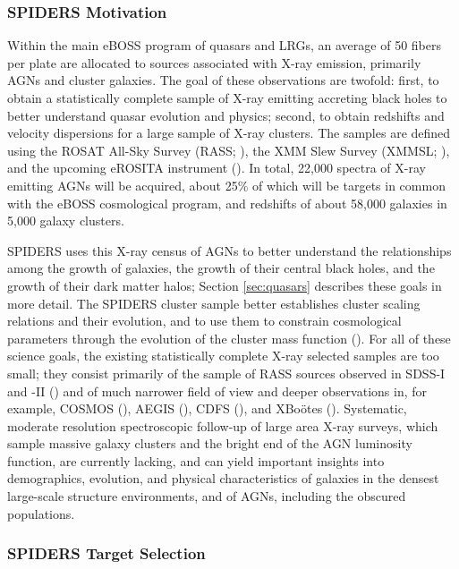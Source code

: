 \subsubsection{SPIDERS Motivation}

Within the main eBOSS program of quasars and LRGs, an average of 50
fibers per plate are allocated to sources associated with X-ray
emission, primarily AGNs and cluster galaxies. The goal of these
observations are twofold: first, to obtain a statistically complete
sample of X-ray emitting accreting black holes to better understand
quasar evolution and physics; second, to obtain redshifts and velocity
dispersions for a large sample of X-ray clusters.  The samples are
defined using the ROSAT All-Sky Survey
(RASS; \citealt{voges99a,boller16a}), the XMM Slew Survey
(XMMSL; \citealt{warwick12a}), and the upcoming eROSITA instrument
(\citealt{merloni12a}). In total, 22,000 spectra of X-ray emitting
AGNs
will be acquired, about 25\% of which will be targets in common with
the eBOSS cosmological program, and redshifts of about 58,000 galaxies
in 5,000 galaxy clusters.

SPIDERS uses this X-ray census of AGNs to better understand the
relationships among the growth of galaxies, the growth of their
central black holes, and the growth of their dark matter halos;
Section \ref{sec:quasars} describes these goals in more detail. The
SPIDERS cluster sample better establishes cluster scaling relations
and their evolution, and to use them to constrain cosmological
parameters through the evolution of the cluster mass function
(\citealt{allen11a, weinberg13a}).  For all of these science goals,
the existing statistically complete X-ray selected samples are too
small; they consist primarily of the sample of RASS sources observed
in SDSS-I and -II (\citealt{anderson03a}) and of much narrower
field of view and deeper observations in, for example, COSMOS
(\citealt{cappelluti09a, civano16a}), AEGIS (\citealt{laird09a,
nandra15a}), CDFS (\citealt{luo08a, xue11a}), and XBo{\"o}tes
(\citealt{kenter05a, murray05a}). Systematic, moderate resolution
spectroscopic follow-up of large area X-ray surveys, which sample
massive galaxy clusters and the bright end of the AGN luminosity
function, are currently lacking, and can yield important insights into
demographics, evolution, and physical characteristics of galaxies in
the densest large-scale structure environments, and of AGNs, including
the obscured populations.

\subsubsection{SPIDERS Target Selection}

